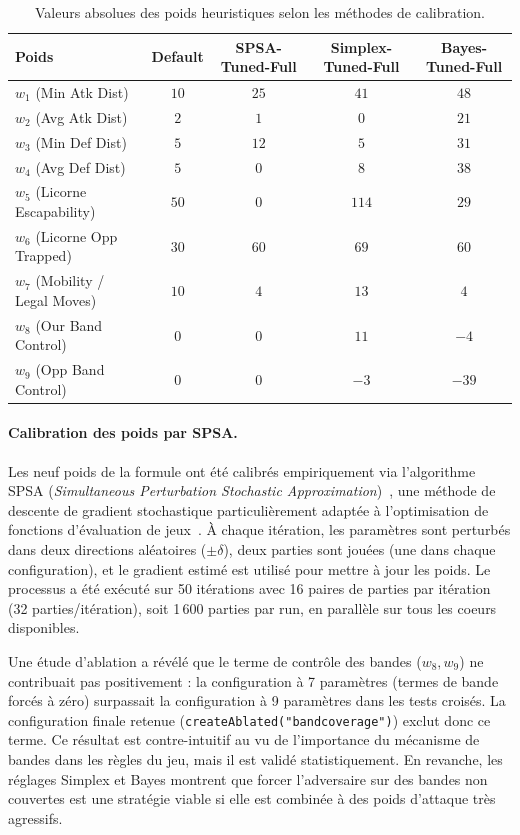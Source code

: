 \documentclass[12pt,a4paper]{article}
\begin{document}
\begin{table}[H]
\centering
\begin{tabular}{l c c c c}
\toprule
Poids & Default & SPSA-Tuned-Full & Simplex-Tuned-Full & Bayes-Tuned-Full \\
\midrule
$w_1$ (Min Atk Dist) & $10$ & $25$ & $41$ & $48$ \\
$w_2$ (Avg Atk Dist) & $2$ & $1$ & $0$ & $21$ \\
$w_3$ (Min Def Dist) & $5$ & $12$ & $5$ & $31$ \\
$w_4$ (Avg Def Dist) & $5$ & $0$ & $8$ & $38$ \\
$w_5$ (Licorne Escapability) & $50$ & $0$ & $114$ & $29$ \\
$w_6$ (Licorne Opp Trapped) & $30$ & $60$ & $69$ & $60$ \\
$w_7$ (Mobility / Legal Moves) & $10$ & $4$ & $13$ & $4$ \\
$w_8$ (Our Band Control) & $0$ & $0$ & $11$ & $-4$ \\
$w_9$ (Opp Band Control) & $0$ & $0$ & $-3$ & $-39$ \\
\bottomrule
\end{tabular}
\caption{Valeurs absolues des poids heuristiques selon les méthodes de calibration.}
\label{tab-heuristic-weights}
\end{table}


\paragraph{Calibration des poids par SPSA.}
Les neuf poids de la formule ont été calibrés empiriquement via l'algorithme SPSA (\textit{Simultaneous Perturbation Stochastic Approximation})~\cite{spall1998}, une méthode de descente de gradient stochastique particulièrement adaptée à l'optimisation de fonctions d'évaluation de jeux~\cite{cp_testing}. À chaque itération, les paramètres sont perturbés dans deux directions aléatoires ($\pm \delta$), deux parties sont jouées (une dans chaque configuration), et le gradient estimé est utilisé pour mettre à jour les poids. Le processus a été exécuté sur 50 itérations avec 16 paires de parties par itération (32 parties/itération), soit 1\,600 parties par run, en parallèle sur tous les coeurs disponibles.

Une étude d'ablation a révélé que le terme de contrôle des bandes ($w_8, w_9$) ne contribuait pas positivement : la configuration à 7 paramètres (termes de bande forcés à zéro) surpassait la configuration à 9 paramètres dans les tests croisés. La configuration finale retenue (\texttt{createAblated("bandcoverage")}) exclut donc ce terme. Ce résultat est contre-intuitif au vu de l'importance du mécanisme de bandes dans les règles du jeu, mais il est validé statistiquement. En revanche, les réglages Simplex et Bayes montrent que forcer l'adversaire sur des bandes non couvertes est une stratégie viable si elle est combinée à des poids d'attaque très agressifs.
\end{document}

